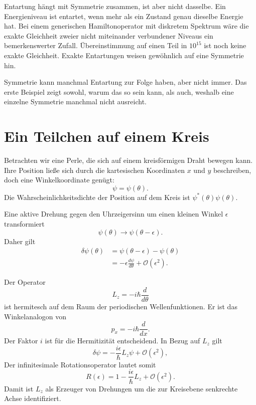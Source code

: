 Entartung hängt mit Symmetrie zusammen, ist aber nicht dasselbe. Ein Energieniveau ist entartet, wenn mehr als ein Zustand genau dieselbe Energie hat. Bei einem generischen Hamiltonoperator mit diskretem Spektrum wäre die exakte Gleichheit zweier nicht miteinander verbundener Niveaus ein bemerkenswerter Zufall. Übereinstimmung auf einen Teil in \(10^{15}\) ist noch keine exakte Gleichheit. Exakte Entartungen weisen gewöhnlich auf eine Symmetrie hin.

Symmetrie kann manchmal Entartung zur Folge haben, aber nicht immer. Das erste Beispiel zeigt sowohl, warum das so sein kann, als auch, weshalb eine einzelne Symmetrie manchmal nicht ausreicht.

\section{Ein Teilchen auf einem Kreis}

Betrachten wir eine Perle, die sich auf einem kreisförmigen Draht bewegen kann. Ihre Position ließe sich durch die kartesischen Koordinaten \(x\) und \(y\) beschreiben, doch eine Winkelkoordinate genügt:
\begin{equation}
\psi=\psi(\theta).
\end{equation}
Die Wahrscheinlichkeitsdichte der Position auf dem Kreis ist \(\psi^*(\theta)\psi(\theta)\).

Eine aktive Drehung gegen den Uhrzeigersinn um einen kleinen Winkel \(\epsilon\) transformiert
\begin{equation}
\psi(\theta)\longrightarrow\psi(\theta-\epsilon).
\end{equation}
Daher gilt
\begin{align}
\delta\psi(\theta)
&=\psi(\theta-\epsilon)-\psi(\theta)\\
&=-\epsilon\frac{d\psi}{d\theta}
+\mathcal O(\epsilon^2).
\end{align}

Der Operator
\begin{equation}
L_z=-i\hbar\frac{d}{d\theta}
\end{equation}
ist hermitesch auf dem Raum der periodischen Wellenfunktionen. Er ist das Winkelanalogon von
\begin{equation}
p_x=-i\hbar\frac{d}{dx}.
\end{equation}
Der Faktor \(i\) ist für die Hermitizität entscheidend. In Bezug auf \(L_z\) gilt
\begin{equation}
\delta\psi
=-\frac{i\epsilon}{\hbar}L_z\psi
+\mathcal O(\epsilon^2),
\end{equation}
Der infinitesimale Rotationsoperator lautet somit
\begin{equation}
R(\epsilon)
=1-\frac{i\epsilon}{\hbar}L_z
+\mathcal O(\epsilon^2).
\end{equation}
Damit ist \(L_z\) als Erzeuger von Drehungen um die zur Kreisebene senkrechte Achse identifiziert.

